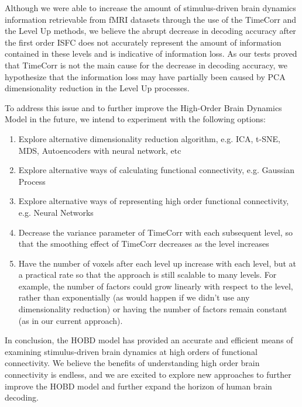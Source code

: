 \documentclass[11pt]{article}
\begin{document}
Although we were able to increase the amount of stimulus-driven brain dynamics information retrievable from fMRI datasets through the use of the TimeCorr and the Level Up methods, we believe the abrupt decrease in decoding accuracy after the first order ISFC does not accurately represent the amount of information contained in these levels and is indicative of information loss. As our tests proved that TimeCorr is not the main cause for the decrease in decoding accuracy, we hypothesize that the information loss may have partially been caused by PCA dimensionality reduction in the Level Up processes.

To address this issue and to further improve the High-Order Brain Dynamics Model in the future, we intend to experiment with the following options:

\begin{enumerate}
\item Explore alternative dimensionality reduction algorithm, e.g. ICA, t-SNE, MDS, Autoencoders with neural network, etc
\item Explore alternative ways of calculating functional connectivity, e.g. Gaussian Process
\item Explore alternative ways of representing high order functional connectivity, e.g. Neural Networks
\item Decrease the variance parameter of TimeCorr with each subsequent level, so that the smoothing effect of TimeCorr decreases as the level increases
\item Have the number of voxels after each level up increase with each level, but at a practical rate so that the approach is still scalable to many levels. For example, the number of factors could grow linearly with respect to the level, rather than exponentially (as would happen if we didn't use any dimensionality reduction) or having the number of factors remain constant (as in our current approach).
\end{enumerate}

In conclusion, the HOBD model has provided an accurate and efficient means of examining stimulus-driven brain dynamics at high orders of functional connectivity. We believe the benefits of understanding high order brain connectivity is endless, and we are excited to explore new approaches to further improve the HOBD model and further expand the horizon of human brain decoding.
\end{document}
